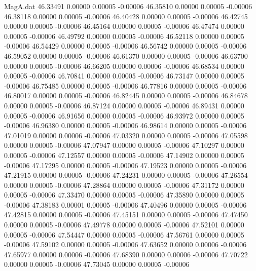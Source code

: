 \begin{filecontents}{MagA.dat}
  46.33491    0.00000    0.00005   -0.00006
  46.35810    0.00000    0.00005   -0.00006
  46.38118    0.00000    0.00005   -0.00006
  46.40428    0.00000    0.00005   -0.00006
  46.42745    0.00000    0.00005   -0.00006
  46.45164    0.00000    0.00005   -0.00006
  46.47474    0.00000    0.00005   -0.00006
  46.49792    0.00000    0.00005   -0.00006
  46.52118    0.00000    0.00005   -0.00006
  46.54429    0.00000    0.00005   -0.00006
  46.56742    0.00000    0.00005   -0.00006
  46.59052    0.00000    0.00005   -0.00006
  46.61370    0.00000    0.00005   -0.00006
  46.63700    0.00000    0.00005   -0.00006
  46.66205    0.00000    0.00006   -0.00006
  46.68534    0.00000    0.00005   -0.00006
  46.70841    0.00000    0.00005   -0.00006
  46.73147    0.00000    0.00005   -0.00006
  46.75485    0.00000    0.00005   -0.00006
  46.77816    0.00000    0.00005   -0.00006
  46.80017    0.00000    0.00005   -0.00006
  46.82445    0.00000    0.00005   -0.00006
  46.84678    0.00000    0.00005   -0.00006
  46.87124    0.00000    0.00005   -0.00006
  46.89431    0.00000    0.00005   -0.00006
  46.91656    0.00000    0.00005   -0.00006
  46.93972    0.00000    0.00005   -0.00006
  46.96380    0.00000    0.00005   -0.00006
  46.98614    0.00000    0.00005   -0.00006
  47.01019    0.00000    0.00006   -0.00006
  47.03320    0.00000    0.00005   -0.00006
  47.05598    0.00000    0.00005   -0.00006
  47.07947    0.00000    0.00005   -0.00006
  47.10297    0.00000    0.00005   -0.00006
  47.12557    0.00000    0.00005   -0.00006
  47.14902    0.00000    0.00005   -0.00006
  47.17295    0.00000    0.00005   -0.00006
  47.19523    0.00000    0.00005   -0.00006
  47.21915    0.00000    0.00005   -0.00006
  47.24231    0.00000    0.00005   -0.00006
  47.26554    0.00000    0.00005   -0.00006
  47.28864    0.00000    0.00005   -0.00006
  47.31172    0.00000    0.00005   -0.00006
  47.33470    0.00000    0.00005   -0.00006
  47.35890    0.00000    0.00005   -0.00006
  47.38183    0.00001    0.00005   -0.00006
  47.40496    0.00000    0.00005   -0.00006
  47.42815    0.00000    0.00005   -0.00006
  47.45151    0.00000    0.00005   -0.00006
  47.47450    0.00000    0.00005   -0.00006
  47.49778    0.00000    0.00005   -0.00006
  47.52101    0.00000    0.00005   -0.00006
  47.54447    0.00000    0.00005   -0.00006
  47.56761    0.00000    0.00005   -0.00006
  47.59102    0.00000    0.00005   -0.00006
  47.63652    0.00000    0.00006   -0.00006
  47.65977    0.00000    0.00006   -0.00006
  47.68390    0.00000    0.00006   -0.00006
  47.70722    0.00000    0.00005   -0.00006
  47.73045    0.00000    0.00005   -0.00006

\end{filecontents}
